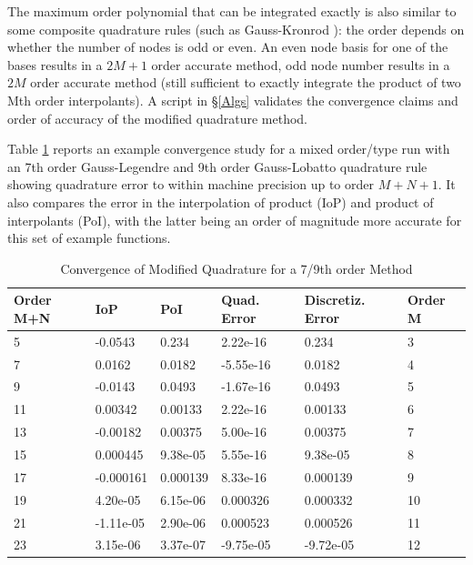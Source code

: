 \documentclass[letterpaper,12pt]{report}
\begin{document}
The maximum order polynomial that can be integrated exactly is also similar to some composite quadrature rules (such as Gauss-Kronrod \cite{Roni}): the order depends on whether the number of nodes is odd or even. An even node basis for one of the bases results in a $2M+1$ order accurate method, odd node number results in a $2M$ order accurate method (still sufficient to exactly integrate the product of two Mth order interpolants). A script in \S \ref{Algs} validates the convergence claims and order of accuracy of the modified quadrature method.

Table \ref{table:QuadMod} reports an example convergence study for a mixed order/type run with an 7th order Gauss-Legendre and 9th order Gauss-Lobatto quadrature rule showing quadrature error to within machine precision up to order $M+N+1$. It also compares the error in the interpolation of product (IoP) and product of interpolants (PoI), with the latter being an order of magnitude more accurate for this set of example functions.

\begin{table}
\centering
\caption{Convergence of Modified Quadrature for a 7/9th order Method}\label{table:QuadMod}
\begin{tabular}{llllll}
\hline
Order M+N & IoP       & PoI      & Quad. Error & Discretiz. Error &  Order M  \\ \hline
5         & -0.0543   & 0.234    & 2.22e-16         & 0.234                & 3  \\
7         & 0.0162    & 0.0182   & -5.55e-16        & 0.0182               & 4  \\
9         & -0.0143   & 0.0493   & -1.67e-16        & 0.0493               & 5  \\
11        & 0.00342   & 0.00133  & 2.22e-16         & 0.00133              & 6  \\
13        & -0.00182  & 0.00375  & 5.00e-16         & 0.00375              & 7  \\
15        & 0.000445  & 9.38e-05 & 5.55e-16         & 9.38e-05             & 8  \\
17        & -0.000161 & 0.000139 & 8.33e-16         & 0.000139             & 9  \\
19        & 4.20e-05  & 6.15e-06 & 0.000326         & 0.000332             & 10 \\
21        & -1.11e-05 & 2.90e-06 & 0.000523         & 0.000526             & 11 \\
23        & 3.15e-06  & 3.37e-07 & -9.75e-05        & -9.72e-05            & 12 \\ \hline
\end{tabular}
\end{table}
\end{document}
